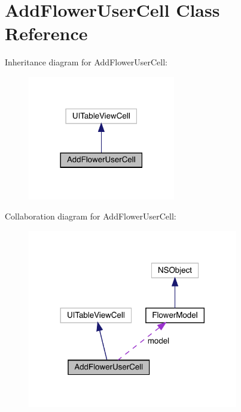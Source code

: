 \hypertarget{interface_add_flower_user_cell}{}\section{Add\+Flower\+User\+Cell Class Reference}
\label{interface_add_flower_user_cell}


Inheritance diagram for Add\+Flower\+User\+Cell\+:\nopagebreak
\begin{figure}[H]
\begin{center}
\leavevmode
\includegraphics[width=182pt]{interface_add_flower_user_cell__inherit__graph}
\end{center}
\end{figure}


Collaboration diagram for Add\+Flower\+User\+Cell\+:\nopagebreak
\begin{figure}[H]
\begin{center}
\leavevmode
\includegraphics[width=260pt]{interface_add_flower_user_cell__coll__graph}
\end{center}
\end{figure}
